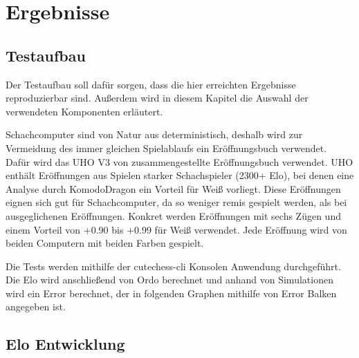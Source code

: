 \chapter{Ergebnisse}
\label{chap:Ergebnisse}

\section{Testaufbau}

Der Testaufbau soll dafür sorgen, dass die hier erreichten Ergebnisse reproduzierbar sind. Außerdem wird in diesem Kapitel die Auswahl der verwendeten Komponenten erläutert.

Schachcomputer sind von Natur aus deterministisch, deshalb wird zur Vermeidung des immer gleichen Spielablaufs ein Eröffnungsbuch verwendet. Dafür wird das \ac{UHO} V3 von \citeauthor{Pohl2021} \cite{Pohl2021} zusammengestellte Eröffnungsbuch verwendet. \ac{UHO} enthält Eröffnungen aus Spielen starker Schachspieler (2300+ Elo), bei denen eine Analyse durch KomodoDragon \cite{KomodoDragon} ein Vorteil für Weiß vorliegt. Diese Eröffnungen eignen sich gut für Schachcomputer, da so weniger remis gespielt werden, als bei ausgeglichenen Eröffnungen. Konkret werden Eröffnungen mit sechs Zügen und einem Vorteil von +0.90 bis +0.99 für Weiß verwendet. Jede Eröffnung wird von beiden Computern mit beiden Farben gespielt.

Die Tests werden mithilfe der cutechess-cli \cite{CutechessRepo} Konsolen Anwendung durchgeführt. Die Elo wird anschließend von Ordo \cite{OrdoRepo} berechnet und anhand von Simulationen wird ein Error berechnet, der in folgenden Graphen mithilfe von Error Balken angegeben ist.

\section{Elo Entwicklung}


